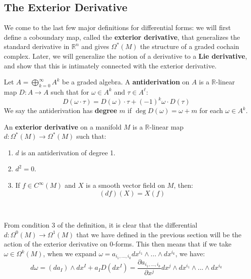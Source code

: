 \subsection{The Exterior Derivative}

We come to the last few major definitions for differential forms: we will first define a coboundary map, called the \textbf{exterior 
derivative}, that generalizes the standard derivative in $\mathbb R^n$ and gives $\Omega^*(M)$ the structure of a 
graded cochain complex. Later, we will generalize the notion of a derivative to a \textbf{Lie derivative}, and show that this 
is intimately connected with the exterior derivative. 

\begin{definition}[Antiderivation]
	Let $A = \bigoplus_{k = 0}^\infty A^k$ be a graded algebra. A \textbf{antiderivation} on $A$ is a $\mathbb R$-linear map 
	$D : A\rightarrow A$ such that for $\omega\in A^k$ and $\tau\in A^\ell$:
	\begin{equation}
		D(\omega\cdot\tau) = D(\omega)\cdot\tau + (-1)^k\omega\cdot D(\tau)
	\end{equation}
	We say the antiderivation has \textbf{degree} $m$ if $\deg D(\omega) = \omega + m$ for each $\omega\in A^k$. 
\end{definition}

\begin{definition}
	An \textbf{exterior derivative} on a manifold $M$ is a $\mathbb R$-linear map $d : \Omega^*(M)\rightarrow\Omega^*(M)$ 
	such that:
	\begin{enumerate}
		\item $d$ is an antiderivation of degree 1. 
		\item $d^2 = 0$. 
		\item If $f\in C^\infty(M)$ and $X$ is a smooth vector field on $M$, then:
		\begin{equation}
			(df)(X) = X(f)
		\end{equation}
	\end{enumerate}~
	\label{def:derivative}
\end{definition}

From condition 3 of the definition, it is clear that the differential $d : \Omega^0(M)\rightarrow\Omega^1(M)$ that we have 
defined in the previous section will be the action of the exterior derivative on $0$-forms. This then means that if we 
take $\omega\in\Omega^k(M)$, when we expand $\omega = a_{i_1, ..., i_k} dx^{i_1}\wedge ...\wedge dx^{i_k}$, we have:
\begin{equation}
	d\omega = (da_I)\wedge dx^I + a_I D(dx^I) = \frac{\partial a_{i_1, ..., i_k}}{\partial x^j}dx^j\wedge dx^{i_1}\wedge ... 
	\wedge dx^{i_k}
\end{equation}

